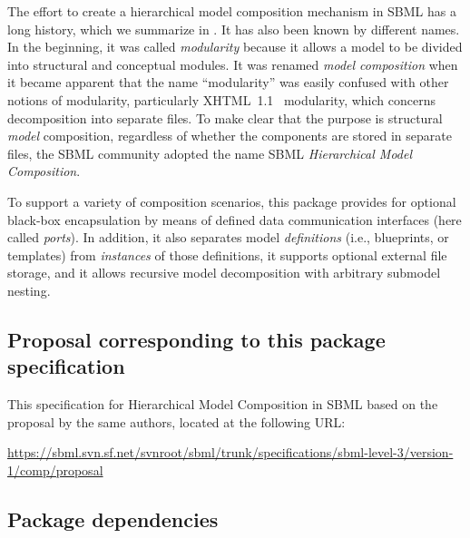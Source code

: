 The effort to create a hierarchical model composition mechanism in SBML has a long history, which we summarize in .  It has also been known by different names.  In the beginning, it was called \emph{modularity} because it allows a model to be divided into structural and conceptual modules.  It was renamed \emph{model   composition} when it became apparent that the name ``modularity'' was easily confused with other notions of modularity, particularly XHTML~1.1~\citep{xhtml} modularity, which concerns decomposition into separate files.  To make clear that the purpose is structural \emph{model} composition, regardless of whether the components are stored in separate files, the SBML community adopted the name SBML \emph{Hierarchical Model Composition}.

To support a variety of composition scenarios, this package provides for optional black-box encapsulation by means of defined data communication interfaces (here called \emph{ports}).  In addition, it also separates model \emph{definitions} (i.e., blueprints, or templates) from \emph{instances} of those definitions, it supports optional external file storage, and it allows recursive model decomposition with arbitrary submodel nesting.


\subsection{Proposal corresponding to this package specification}

This specification for Hierarchical Model Composition in SBML  based on the proposal by the same authors, located at the following URL:

\begin{center}
  \vspace*{1ex}\small
  \url{https://sbml.svn.sf.net/svnroot/sbml/trunk/specifications/sbml-level-3/version-1/comp/proposal}
  \vspace*{1ex}
\end{center}



\subsection{Package dependencies}

